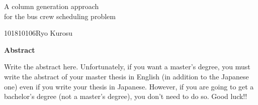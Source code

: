 

\newpage
\begin{center}{\LARGE A column generation approach \\for the bus crew scheduling problem}\\[0.5cm]
\end{center}
\hfill {\large 101810106\qquad Ryo Kurosu}\\[0.5cm]
\begin{center}
{\large \bf Abstract}\\
\end{center}
Write the abstract here.
Unfortunately, if you want a master's degree, you must write the abstract of your master thesis
in English (in addition to the Japanese one) even if you write your thesis in Japanese.
However, if you are going to get a bachelor's degree (not a master's degree),
you don't need to do so.
Good luck!!
